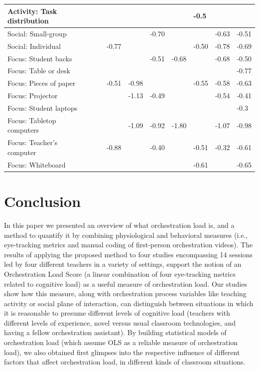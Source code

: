 \documentclass[10pt,journal,compsoc]{IEEEtran}
\begin{document}
\begin{table}[!t]
\begin{tabular}{|p{3cm}||p{1.2cm}|p{1.2cm}|p{1.2cm}|p{1.2cm}|p{1.2cm}|p{1.2cm}|p{1.2cm}|p{1.2cm}|p{1.2cm}|}
   \hline
  Activity: Task distribution &    &    &    &    &    &    & -0.5 &    &    \\ 
   \hline
  Social: Small-group &     &     &     &     & -0.70 &     &     & -0.63 & -0.51 \\ 
   \hline
  Social: Individual &     &     & -0.77 &     &     &     & -0.50 & -0.78 & -0.69 \\ 
   \hline
  Focus: Student backs &     &     &     &     & -0.51 & -0.68 &     & -0.68 & -0.50 \\ 
   \hline
  Focus: Table or desk &     &     &     &     &     &     &     &     & -0.77 \\ 
   \hline
  Focus: Pieces of paper &     &     & -0.51 & -0.98 &     &     & -0.55 & -0.58 & -0.63 \\ 
   \hline
  Focus: Projector &     &     &     & -1.13 & -0.49 &     &     & -0.54 & -0.41 \\ 
   \hline
  Focus: Student laptops &    &    &    &    &    &    &    &    & -0.3 \\ 
   \hline
  Focus: Tabletop computers &     &     &     & -1.09 & -0.92 & -1.80 &     & -1.07 & -0.98 \\ 
   \hline
  Focus: Teacher's computer &     &     & -0.88 &     & -0.40 &     & -0.51 & -0.32 & -0.61 \\ 
   \hline
  Focus: Whiteboard &     &     &     &     &     &     & -0.61 &     & -0.65 \\ 
   \hline
\end{tabular}
\end{table}


\section{Conclusion}
\label{sec:conclusion}

In this paper we presented an overview of what orchestration load is, and a method to quantify it by combining physiological and behavioral measures (i.e., eye-tracking metrics and manual coding of first-person orchestration videos). The results of applying the proposed method to four studies encompassing 14 sessions led by four different teachers in a variety of settings, support the notion of an Orchestration Load Score (a linear combination of four eye-tracking metrics related to cognitive load) as a useful measure of orchestration load. Our studies show how this measure, along with orchestration process variables like teaching activity or social plane of interaction, can distinguish between situations in which it is reasonable to presume different levels of cognitive load (teachers with different levels of experience, novel versus usual classroom technologies, and having a fellow orchestration assistant). By building statistical models of orchestration load (which assume OLS as a reliable measure of orchestration load), we also obtained first glimpses into the respective influence of different factors that affect orchestration load, in different kinds of classroom situations.
\end{document}
